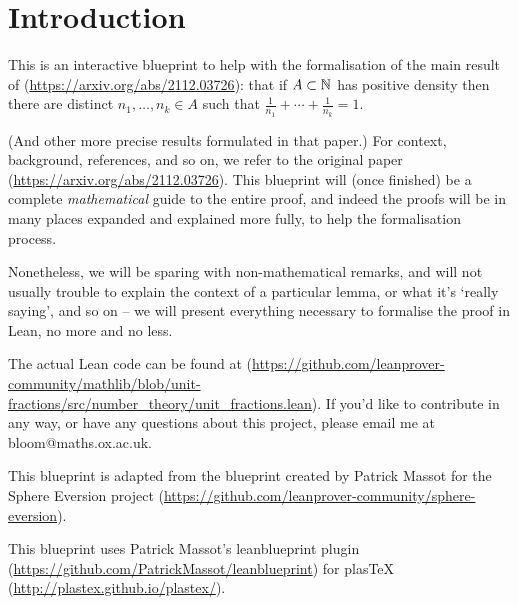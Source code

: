 \chapter*{Introduction}
\label{cha:intro}

This is an interactive blueprint to help with the formalisation of the main result of (\url{https://arxiv.org/abs/2112.03726}): that if $A\subset \mathbb{N}$ has positive density then there are distinct $n_1,\ldots,n_k\in A$ such that $\frac{1}{n_1}+\cdots+\frac{1}{n_k}=1$. 

(And other more precise results formulated in that paper.) For context, background, references, and so on, we refer to the original paper (\url{https://arxiv.org/abs/2112.03726}). This blueprint will (once finished) be a complete \emph{mathematical} guide to the entire proof, and indeed the proofs will be in many places expanded and explained more fully, to help the formalisation process.

Nonetheless, we will be sparing with non-mathematical remarks, and will not usually trouble to explain the context of a particular lemma, or what it's `really saying', and so on -- we will present everything necessary to formalise the proof in Lean, no more and no less.

The actual Lean code can be found at (\url{https://github.com/leanprover-community/mathlib/blob/unit-fractions/src/number_theory/unit_fractions.lean}). If you'd like to contribute in any way, or have any questions about this project, please email me at bloom@maths.ox.ac.uk. 

This blueprint is adapted from the blueprint created by Patrick Massot for the Sphere Eversion project (\url{https://github.com/leanprover-community/sphere-eversion}).


This blueprint uses Patrick Massot's leanblueprint plugin (\url{https://github.com/PatrickMassot/leanblueprint}) for plasTeX (\url{http://plastex.github.io/plastex/}). 
